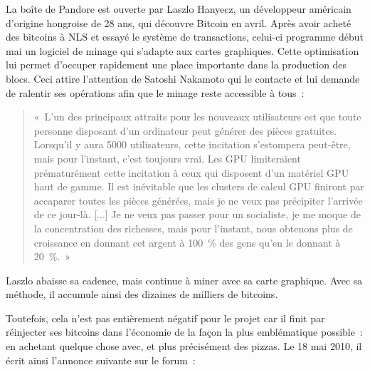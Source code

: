 La boîte de Pandore est ouverte par Laszlo Hanyecz, un développeur américain d'origine hongroise de 28 ans, qui découvre Bitcoin en avril. Après avoir acheté des bitcoins à NLS et essayé le système de transactions, celui-ci programme début mai un logiciel de minage qui s'adapte aux cartes graphiques. Cette optimisation lui permet d'occuper rapidement une place importante dans la production des blocs. Ceci attire l'attention de Satoshi Nakamoto qui le contacte et lui demande de ralentir ses opérations afin que le minage reste accessible à tous~:

\begin{quote}
«~L'un des principaux attraits pour les nouveaux utilisateurs est que toute personne disposant d'un ordinateur peut générer des pièces gratuites. Lorsqu'il y aura 5000 utilisateurs, cette incitation s'estompera peut-être, mais pour l'instant, c'est toujours vrai. Les GPU limiteraient prématurément cette incitation à ceux qui disposent d'un matériel GPU haut de gamme. Il est inévitable que les clusters de calcul GPU finiront par accaparer toutes les pièces générées, mais je ne veux pas précipiter l'arrivée de ce jour-là. [...] Je ne veux pas passer pour un socialiste, je me moque de la concentration des richesses, mais pour l'instant, nous obtenons plus de croissance en donnant cet argent à 100~\% des gens qu'en le donnant à 20~\%.~»
\end{quote}

Laszlo abaisse sa cadence, mais continue à miner avec sa carte graphique. Avec sa méthode, il accumule ainsi des dizaines de milliers de bitcoins.

Toutefois, cela n'est pas entièrement négatif pour le projet car il finit par réinjecter ses bitcoins dans l'économie de la façon la plus emblématique possible~: en achetant quelque chose avec, et plus précisément des pizzas. Le 18 mai 2010, il écrit ainsi l'annonce suivante sur le forum~:

